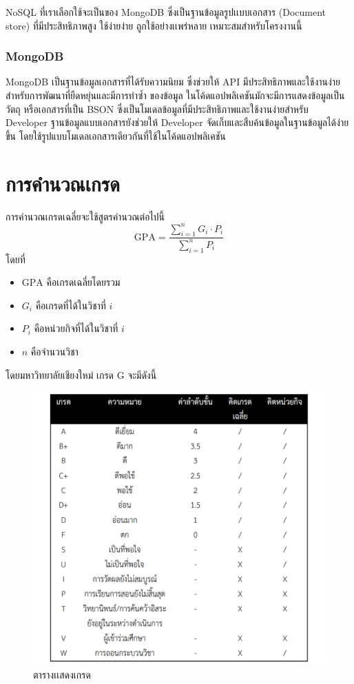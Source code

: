 NoSQL ที่เราเลือกใช้จะเป็นของ MongoDB ซึ่งเป็นฐานข้อมูลรูปเเบบเอกสาร (Document store) ที่มีประสิทธิภาพสูง ใช้ง่ายง่าย ถูกใช้อย่างเเพร่หลาย เหมาะสมสําหรับโครงงานนี้

\subsubsection{ MongoDB}


MongoDB เป็นฐานข้อมูลเอกสารที่ได้รับความนิยม ซึ่งช่วยให้ API มีประสิทธิภาพและใช้งานง่ายสำหรับการพัฒนาที่ยืดหยุ่นและมีการทำซ้ำ ของข้อมูล ในโค้ดแอปพลิเคชันมักจะมีการแสดงข้อมูลเป็นวัตถุ หรือเอกสารที่เป็น BSON ซึ่งเป็นโมเดลข้อมูลที่มีประสิทธิภาพและใช้งานง่ายสำหรับ Developer ฐานข้อมูลแบบเอกสารยังช่วยให้ Developer จัดเก็บและสืบค้นข้อมูลในฐานข้อมูลได้ง่ายขึ้น โดยใช้รูปแบบโมเดลเอกสารเดียวกันที่ใช้ในโค้ดแอปพลิเคชัน 

\section{การคํานวณเกรด}

การคำนวณเกรดเฉลี่ยจะใช้สูตรคำนวณต่อไปนี้
\[\mathrm{GPA}=\frac{\sum_{i=1}^{n}{G_i\cdot P_i}}{\sum_{i=1}^{n}{P_i}}\]
โดยที่
\begin{itemize}
\item $\mathrm{GPA}$ คือเกรดเฉลี่ยโดยรวม 
\item $G_i$ คือเกรดที่ได้ในวิชาที่ $i$
\item $P_i$ คือหน่วยกิจที่ได้ในวิชาที่ $i$
\item $n$ คือจำนวนวิชา
\end{itemize}
โดยมหาวิทยาลัยเชียงใหม่ เกรด G จะมีดังนี้ 

\begin{figure}
  \begin{center}
  \includegraphics[width=1\textwidth]{table.png}
  \end{center}
  \caption {ตารางเเสดงเกรด}
  \end{figure}

